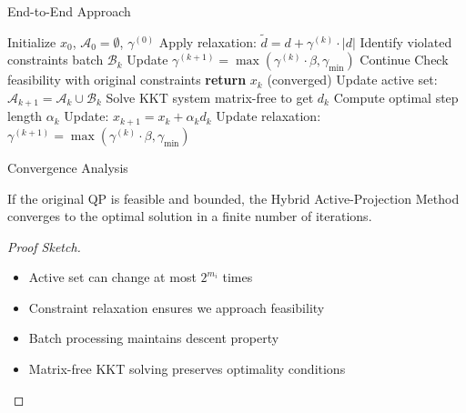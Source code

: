 \documentclass{beamer}
\begin{document}
\begin{frame}{End-to-End Approach}
    \begin{algorithm}[H]
        \caption{Hybrid Active-Projection Method}
        \begin{algorithmic}[1]
            \STATE Initialize $x_0$, $\mathcal{A}_0 = \emptyset$, $\gamma^{(0)}$
                \STATE Apply relaxation: $\tilde{d} = d + \gamma^{(k)} \cdot |d|$
                \STATE Identify violated constraints batch $\mathcal{B}_k$
                        \STATE Update $\gamma^{(k+1)} = \max(\gamma^{(k)} \cdot \beta, \gamma_{\min})$
                        \STATE Continue
                    \ELSE
                        \STATE Check feasibility with original constraints
                            \STATE \textbf{return} $x_k$ (converged)
                        \ENDIF
                    \ENDIF
                \ENDIF
                \STATE Update active set: $\mathcal{A}_{k+1} = \mathcal{A}_k \cup \mathcal{B}_k$
                \STATE Solve KKT system matrix-free to get $d_k$
                \STATE Compute optimal step length $\alpha_k$
                \STATE Update: $x_{k+1} = x_k + \alpha_k d_k$
                \STATE Update relaxation: $\gamma^{(k+1)} = \max(\gamma^{(k)} \cdot \beta, \gamma_{\min})$
            \ENDFOR
        \end{algorithmic}
    \end{algorithm}
\end{frame}

\begin{frame}{Convergence Analysis}
    \begin{theorem}
        If the original QP is feasible and bounded, the Hybrid Active-Projection Method converges to the optimal solution in a finite number of iterations.
    \end{theorem}
    
    \begin{proof}[Proof Sketch]
        \begin{itemize}
            \item Active set can change at most $2^{m_i}$ times
            \item Constraint relaxation ensures we approach feasibility
            \item Batch processing maintains descent property
            \item Matrix-free KKT solving preserves optimality conditions
        \end{itemize}
    \end{proof}
\end{frame}
\end{document}
